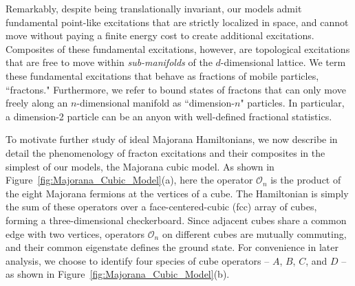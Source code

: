 \documentclass[aps,twocolumn,preprintnumbers,floatfix,showpacs,prx]{revtex4-1}
\begin{document}
Remarkably, despite being translationally invariant, our models admit fundamental point-like excitations that are strictly localized in space,
and cannot move without paying a finite energy cost to create additional excitations.
Composites of these fundamental excitations, however, %
are topological excitations that are free to move within {\it sub-manifolds} of the $d$-dimensional lattice. 
We term these fundamental excitations that behave as fractions of mobile particles, ``fractons."
Furthermore, we refer to bound states of fractons that can only move freely along an $n$-dimensional manifold as ``dimension-$n$" particles.
In particular, a dimension-2 particle can be an anyon with well-defined fractional statistics.  

To motivate further study of ideal Majorana Hamiltonians,
we now describe in detail the phenomenology of fracton excitations and their composites in the simplest of our models, the Majorana cubic model.
As shown in Figure~\ref{fig:Majorana_Cubic_Model}(a),
here the operator $\mathcal{O}_{n}$ is the product of the eight Majorana fermions at the vertices of a cube.
The Hamiltonian is simply the sum of these operators over a face-centered-cubic (fcc) array of cubes, forming a three-dimensional checkerboard.
Since adjacent cubes share a common edge with two vertices, operators  $\mathcal{O}_{n}$ on different cubes are mutually commuting,
and their common eigenstate defines the ground state.
For convenience in later analysis, we choose to identify four species of cube operators -- $A$, $B$, $C$, and $D$ -- 
as shown in Figure~\ref{fig:Majorana_Cubic_Model}(b). 
\end{document}
